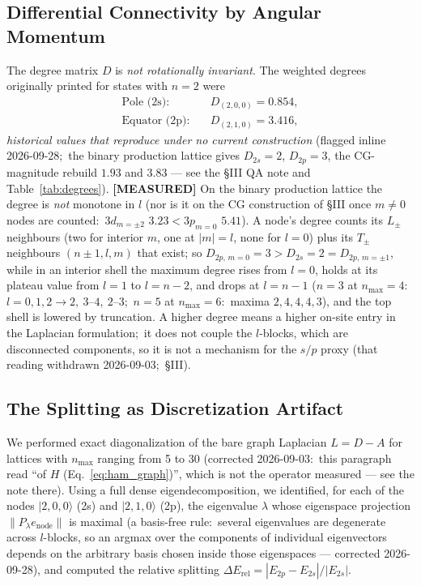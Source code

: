 \documentclass[aps,pra,twocolumn,superscriptaddress,longbibliography]{revtex4-2}
\begin{document}
\subsection{Differential Connectivity by Angular Momentum}

The degree matrix $D$ is \textit{not rotationally invariant}. The weighted degrees originally printed for states with $n=2$ were
\begin{align}
\text{Pole (2s):} \quad & D_{(2,0,0)} = 0.854, \\
\text{Equator (2p):} \quad & D_{(2,1,0)} = 3.416,
\end{align}
\emph{historical values that reproduce under no current construction} (flagged inline 2026-09-28;\ the binary production lattice gives $D_{2s} = 2$, $D_{2p} = 3$, the CG-magnitude rebuild $1.93$ and $3.83$ --- see the \S III QA note and Table~\ref{tab:degrees}).
\textbf{[MEASURED]} On the binary production lattice the degree is \emph{not} monotone in $l$ (nor is it on the CG construction of \S III once $m \ne 0$ nodes are counted:\ $3d_{m=\pm2}$ $3.23 < 3p_{m=0}$ $5.41$). A node's degree counts its $L_\pm$ neighbours (two for interior $m$, one at $|m| = l$, none for $l = 0$) plus its $T_\pm$ neighbours $(n \pm 1, l, m)$ that exist; so $D_{2p,\,m=0} = 3 > D_{2s} = 2 = D_{2p,\,m=\pm1}$, while in an interior shell the maximum degree rises from $l = 0$, holds at its plateau value from $l = 1$ to $l = n-2$, and drops at $l = n-1$ ($n = 3$ at $n_{\max} = 4$:\ $l = 0, 1, 2 \to 2,\ 3$--$4,\ 2$--$3$;\ $n = 5$ at $n_{\max} = 6$:\ maxima $2, 4, 4, 4, 3$), and the top shell is lowered by truncation. A higher degree means a higher on-site entry in the Laplacian formulation;\ it does not couple the $l$-blocks, which are disconnected components, so it is not a mechanism for the $s/p$ proxy (that reading withdrawn 2026-09-03;\ \S III).

\subsection{The Splitting as Discretization Artifact}

We performed exact diagonalization of the bare graph Laplacian
$L = D - A$ for lattices with $n_{\max}$ ranging from 5 to 30 (corrected
2026-09-03:\ this paragraph read ``of $H$ (Eq.~\ref{eq:ham_graph})'', which is
not the operator measured --- see the note there).  Using a full dense
eigendecomposition, we identified, for each of the nodes
$|2,0,0\rangle$ (2s) and $|2,1,0\rangle$ (2p), the eigenvalue $\lambda$
whose eigenspace projection $\|P_\lambda e_{\mathrm{node}}\|$ is maximal
(a basis-free rule:\ several eigenvalues are degenerate across $l$-blocks,
so an argmax over the components of individual eigenvectors depends on the
arbitrary basis chosen inside those eigenspaces --- corrected 2026-09-28),
and computed the relative splitting $\Delta E_{\mathrm{rel}} = |E_{2p} - E_{2s}|/|E_{2s}|$.
\end{document}
